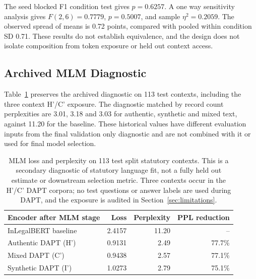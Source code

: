\documentclass[pdflatex,sn-basic]{sn-jnl}
\begin{document}
The seed blocked F1 condition test gives \(p=0.6257\).
A one way sensitivity analysis gives \(F(2,6)=0.7779\), \(p=0.5007\),
and sample \(\eta^2=0.2059\). The observed spread of means is 0.72 points,
compared with pooled within condition SD 0.71.
These results do not establish equivalence, and the design does not isolate
composition from token exposure or held out context access.

\subsection{Archived MLM Diagnostic}

Table~\ref{tab:ppl} preserves the archived diagnostic on 113 test contexts,
including the three context H'/C' exposure. The diagnostic matched by record count
perplexities are 3.01, 3.18 and 3.03 for authentic, synthetic and mixed text,
against 11.20 for the baseline. These historical values have different
evaluation inputs from the final validation only diagnostic and are not
combined with it or used for final model selection.

\begin{table}[!htbp]
\caption{MLM loss and perplexity on 113 test split statutory contexts. This is
a secondary diagnostic of statutory language fit, not a fully held out estimate
or downstream selection metric. Three contexts occur in the H'/C' DAPT
corpora; no test questions or answer labels are used during DAPT, and the
exposure is audited in Section~\ref{sec:limitations}.}
\label{tab:ppl}
\centering
\begin{tabular}{@{}lrrr@{}}
\toprule
Encoder after MLM stage & Loss & Perplexity & PPL reduction \\
\midrule
InLegalBERT baseline & 2.4157 & 11.20 & -- \\
Authentic DAPT (H') & 0.9131 & 2.49 & 77.7\% \\
Mixed DAPT (C') & 0.9438 & 2.57 & 77.1\% \\
Synthetic DAPT (I') & 1.0273 & 2.79 & 75.1\% \\
\bottomrule
\end{tabular}
\end{table}
\end{document}

